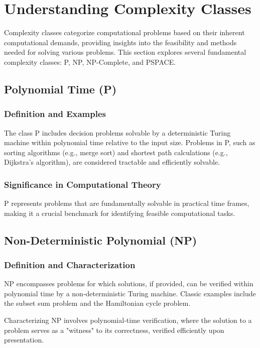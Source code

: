 \section{Understanding Complexity Classes}

Complexity classes categorize computational problems based on their inherent computational demands, providing insights into the feasibility and methods needed for solving various problems. This section explores several fundamental complexity classes: P, NP, NP-Complete, and PSPACE.

\subsection{Polynomial Time (P)}

\subsubsection{Definition and Examples}
The class P includes decision problems solvable by a deterministic Turing machine within polynomial time relative to the input size. Problems in P, such as sorting algorithms (e.g., merge sort) and shortest path calculations (e.g., Dijkstra's algorithm), are considered tractable and efficiently solvable.

\subsubsection{Significance in Computational Theory}
P represents problems that are fundamentally solvable in practical time frames, making it a crucial benchmark for identifying feasible computational tasks.

\subsection{Non-Deterministic Polynomial (NP)}

\subsubsection{Definition and Characterization}
NP encompasses problems for which solutions, if provided, can be verified within polynomial time by a non-deterministic Turing machine. Classic examples include the subset sum problem and the Hamiltonian cycle problem.

Characterizing NP involves polynomial-time verification, where the solution to a problem serves as a "witness" to its correctness, verified efficiently upon presentation.

